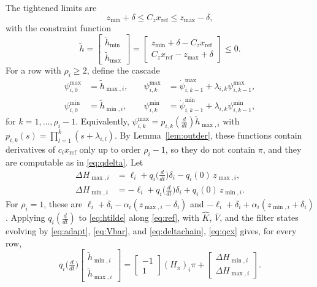 \documentclass[lettersize,journal]{IEEEtran}
\newcommand{\Kh}{\hat{K}}
\newcommand{\xr}{x_{\mathrm{ref}}}
\newcommand{\Vb}{\bar{V}}
\begin{document}
The tightened limits are
\begin{equation}
z_{\min}+\delta \le C_z\xr \le z_{\max}-\delta, \label{eq:tight}
\end{equation}
with the constraint function
\begin{equation}
\tilde h = \begin{bmatrix}\tilde h_{\min}\\ \tilde h_{\max}\end{bmatrix}
= \begin{bmatrix} z_{\min}+\delta-C_z\xr\\ C_z\xr-z_{\max}+\delta\end{bmatrix}\le0. \label{eq:htilde}
\end{equation}
For a row with $\rho_i\ge2$, define the cascade
\begin{equation}
\begin{aligned}
\psi^{\max}_{i,0}&=\tilde h_{\max,i},\quad &\psi^{\max}_{i,k}&=\dot\psi^{\max}_{i,k-1}+\lambda_{i,k}\psi^{\max}_{i,k-1},\\
\psi^{\min}_{i,0}&=\tilde h_{\min,i},\quad &\psi^{\min}_{i,k}&=\dot\psi^{\min}_{i,k-1}+\lambda_{i,k}\psi^{\min}_{i,k-1},
\end{aligned} \label{eq:psi}
\end{equation}
for $k=1,\dots,\rho_i-1$. Equivalently, $\psi^{\max}_{i,k}=p_{i,k}(\frac{d}{dt})\tilde h_{\max,i}$ with $p_{i,k}(s)=\prod_{l=1}^k(s+\lambda_{i,l})$. By Lemma~\ref{lem:outder}, these functions contain derivatives of $c_i\xr$ only up to order $\rho_i-1$, so they do not contain $\pi$, and they are computable as in \eqref{eq:qdelta}. Let
\begin{align}
\Delta H_{\max,i} &= \ell_i + q_i\big(\tfrac{d}{dt}\big)\delta_i - q_i(0)\,z_{\max,i}, \label{eq:dHmax}\\
\Delta H_{\min,i} &= -\ell_i + q_i\big(\tfrac{d}{dt}\big)\delta_i + q_i(0)\,z_{\min,i}. \label{eq:dHmin}
\end{align}
For $\rho_i=1$, these are $\ell_i+\dot\delta_i-\alpha_i(z_{\max,i}-\delta_i)$ and $-\ell_i+\dot\delta_i+\alpha_i(z_{\min,i}+\delta_i)$. Applying $q_i(\frac{d}{dt})$ to \eqref{eq:htilde} along \eqref{eq:ref}, with $\Kh$, $\Vb$, and the filter states evolving by \eqref{eq:adapt}, \eqref{eq:Vbar}, and \eqref{eq:deltachain}, \eqref{eq:qcx} gives, for every row,
\begin{equation}
q_i\big(\tfrac{d}{dt}\big)\begin{bmatrix}\tilde h_{\min,i}\\ \tilde h_{\max,i}\end{bmatrix} = \begin{bmatrix}-1\\ 1\end{bmatrix}(H_\pi)_i\pi + \begin{bmatrix}\Delta H_{\min,i}\\ \Delta H_{\max,i}\end{bmatrix}. \label{eq:hdot}
\end{equation}
\end{document}
